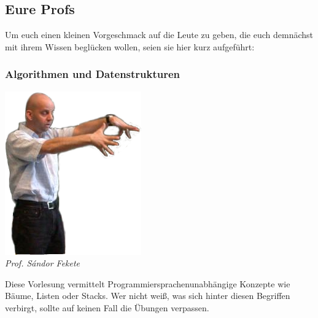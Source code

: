\begin{multicols}{2}
\subsection{Eure Profs}
	Um euch einen kleinen Vorgeschmack auf die Leute zu geben, die euch demnächst mit ihrem Wissen beglücken wollen, seien sie hier kurz aufgeführt:

\subsubsection{Algorithmen und Datenstrukturen}
	\includegraphics[width=0.7\linewidth]{bilder/dozenten/fekete_frei.png}\\
	\textit{Prof. S\'andor Fekete}

	Diese Vorlesung vermittelt Programmiersprachenunabhängige Konzepte wie Bäume, Listen oder Stacks. Wer nicht weiß, was sich hinter diesen Begriffen verbirgt, sollte auf keinen Fall die Übungen verpassen.


\end{multicols}
